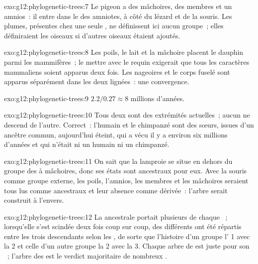 \begin{solution}{exo:g12:phylogenetic-trees:7}
Le pigeon a des mâchoires, des membres et un amnios~: il entre dans le
 des amniotes, à côté du lézard et de la souris. Les plumes,
présentes chez une seule , ne définissent ici aucun groupe~;
elles définiraient les oiseaux si d'autres oiseaux étaient ajoutés.
\end{solution}

\begin{solution}{exo:g12:phylogenetic-trees:8}
Les poils, le lait et la mâchoire placent le dauphin parmi les
mammifères~; le mettre avec le requin exigerait que tous les
caractères mammaliens soient apparus deux fois. Les nageoires et le
corps fuselé sont apparus séparément dans les deux lignées~: une
convergence.
\end{solution}

\begin{solution}{exo:g12:phylogenetic-trees:9}
$2.2/0.27 \approx 8$ millions d'années.
\end{solution}

\begin{solution}{exo:g12:phylogenetic-trees:10}
Tous deux sont des extrémités actuelles~; aucun ne descend de l'autre.
Correct~: l'humain et le chimpanzé sont des  sœurs, issues d'un
ancêtre commun, aujourd'hui éteint, qui a vécu il y a environ six
millions d'années et qui n'était ni un humain ni un chimpanzé.
\end{solution}

\begin{solution}{exo:g12:phylogenetic-trees:11}
On sait que la lamproie se situe en dehors du groupe des  à
mâchoires, donc ses états sont ancestraux pour eux. Avec la souris
comme groupe externe, les poils, l'amnios, les membres et les
mâchoires seraient tous lus comme ancestraux et leur absence comme
dérivée~: l'arbre serait construit à l'envers.
\end{solution}

\begin{solution}{exo:g12:phylogenetic-trees:12}
La  ancestrale portait plusieurs  de chaque ~;
lorsqu'elle s'est scindée deux fois coup sur coup, des 
différents ont été répartis entre les trois descendants selon les
, de sorte que l'histoire d'un  groupe l' 1 avec la 2
et celle d'un autre groupe la 2 avec la 3. Chaque arbre de  est
juste pour son ~; l'arbre des  est le verdict majoritaire
de nombreux .
\end{solution}


